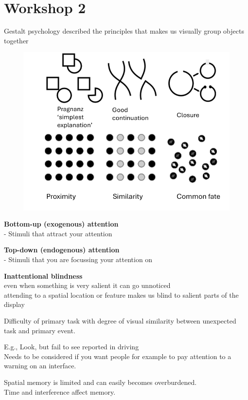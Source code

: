 \documentclass[]{project_plan}
\begin{document}
\chapter{Workshop 2}
Gestalt psychology described the principles that makes us visually group objects
together
\begin{figure}[h!]
  \centering
  \includegraphics[width=\linewidth]{gestalt_psychology_group_objects_principles.png}
\end{figure}

\textbf{Bottom-up (exogenous) attention} \\
- Stimuli that attract your attention

\textbf{Top-down (endogenous) attention}\\
- Stimuli that you are focussing your attention on

\textbf{Inattentional blindness}\\
even when something  is very salient it can go unnoticed \\
attending to a spatial location or feature makes us blind to salient parts of the display

Difficulty of primary task with degree of visual similarity between unexpected task and primary event.

E.g., Look, but fail to see reported in driving\\
Needs to be considered if you want people for example to pay attention to a warning on an interface.

Spatial memory is limited and can easily becomes overburdened.\\
Time and interference affect memory.
\end{document}
